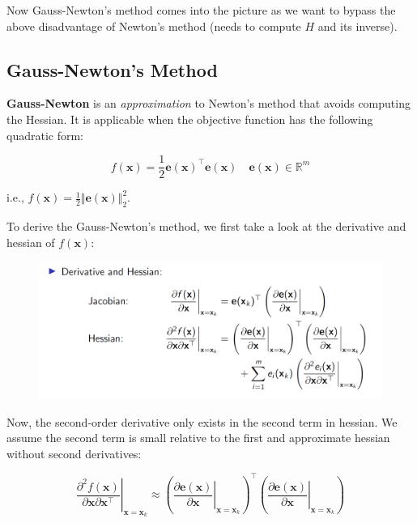 Now Gauss-Newton's method comes into the picture as we want to bypass 
the above disadvantage of Newton's method (needs to compute $H$ and its inverse).

\subsection{Gauss-Newton's Method}

\textbf{Gauss-Newton} is an \textit{approximation} to Newton's method that avoids
computing the Hessian. It is applicable when the objective function has the
following quadratic form:

\begin{equation}
    f(\mathbf{x})=\frac{1}{2} \mathbf{e}(\mathbf{x})^{\top} \mathbf{e}(\mathbf{x}) \quad \mathbf{e}(\mathbf{x}) \in \mathbb{R}^m
\end{equation}

i.e., $f(\mathbf{x})= \frac{1}{2} \Vert \mathbf{e}(\mathbf{x}) \Vert _2^2 $.

To derive the Gauss-Newton's method, we first take a look at the derivative and hessian of $f(\mathbf{x})$:

\begin{figure}[!htb]
    \centering
    \includegraphics[width=12cm]{./img/img-2-3/y_2_3_3.png}
    \label{fig:y_2_3_3}
\end{figure}

Now, the second-order derivative only exists in the second term in hessian.
We assume the second term is small relative to the first and approximate hessian without second derivatives:

\begin{equation}
    \left.\frac{\partial^2 f(\mathbf{x})}{\partial \mathbf{x} \partial \mathbf{x}^{\top}}\right|_{\mathbf{x}=\mathbf{x}_k} \approx\left(\left.\frac{\partial \mathbf{e}(\mathbf{x})}{\partial \mathbf{x}}\right|_{\mathbf{x}=\mathbf{x}_k}\right)^{\top}\left(\left.\frac{\partial \mathbf{e}(\mathbf{x})}{\partial \mathbf{x}}\right|_{\mathbf{x}=\mathbf{x}_k}\right)
    \label{hessian-appr}
\end{equation}

